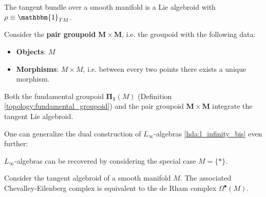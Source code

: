     \begin{example}
        The tangent bundle over a smooth manifold is a Lie algebroid with $\rho\equiv\mathbbm{1}_{TM}$.

        Consider the \textbf{pair groupoid} $\mathbf{M\times M}$, i.e. the groupoid with the following data:
        \begin{itemize}
            \item\textbf{Objects}: $M$
            \item\textbf{Morphisms}: $M\times M$, i.e. between every two points there exists a unique morphism.
        \end{itemize}
        Both the fundamental groupoid $\mathbf{\Pi_1}(M)$ (Definition \ref{topology:fundamental_groupoid}) and the pair groupoid $\mathbf{M\times M}$ integrate the tangent Lie algebroid.
    \end{example}

    One can generalize the dual construction of $L_\infty$-algebras \ref{hda:l_infinity_bis} even further:
    \begin{property}
        $L_\infty$-algebras can be recovered by considering the special case $M=\{\ast\}$.
    \end{property}

    \begin{example}
        Consider the tangent algebroid of a smooth manifold $M$. The associated Chevalley-Eilenberg complex is equivalent to the de Rham complex $\Omega^\bullet(M)$.
    \end{example}

